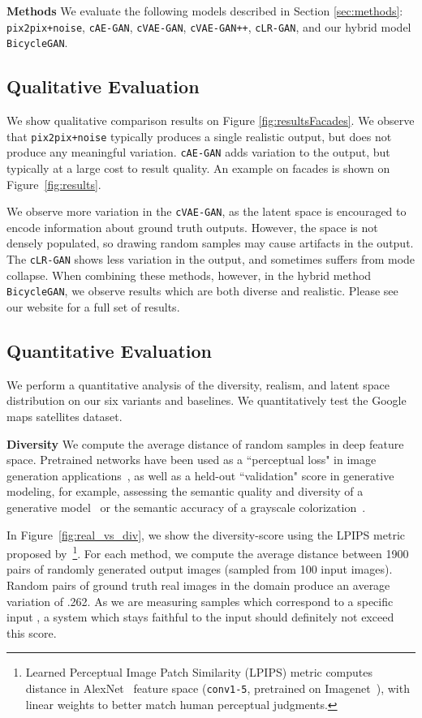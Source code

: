 \documentclass{article}
\newcommand{\ppn}{\texttt{pix2pix+noise}\xspace}
\newcommand{\cinfogan}{\texttt{cLR-GAN}\xspace}
\newcommand{\cae}{\texttt{cAE-GAN}\xspace}
\newcommand{\cvaegan}{\texttt{cVAE-GAN}\xspace}
\newcommand{\cvaeganp}{\texttt{cVAE-GAN++}\xspace}
\newcommand{\bicycle}{\texttt{BicycleGAN}\xspace} \newcommand{\G}{G\xspace}
\begin{document}
{\bf Methods} We evaluate the following models described in Section \ref{sec:methods}: \ppn, \cae, \cvaegan, \cvaeganp, \cinfogan, and our hybrid model \bicycle.

\subsection{Qualitative Evaluation}
\vspace{-1mm}
We show qualitative comparison results on Figure \ref{fig:resultsFacades}. We observe that \ppn typically produces a single realistic output, but does not produce any meaningful variation.
\cae adds variation to the output, but typically at a large cost to result quality. An example on facades is shown on Figure~\ref{fig:results}.

We observe more variation in the \cvaegan, as the latent space is encouraged to encode information about ground truth outputs. However, the space is not densely populated, so drawing random samples may cause artifacts in the output. The \cinfogan shows less variation in the output, and sometimes suffers from mode collapse. When combining these methods, however, in the hybrid method \bicycle, we observe results which are both diverse and realistic. Please see our website for a full set of results.

\vspace{-1mm}
\subsection{Quantitative Evaluation}
\vspace{-1mm}
We perform a quantitative analysis of the diversity, realism, and latent space distribution on our six variants and baselines. We quantitatively test the Google maps  satellites dataset.

{\bf Diversity} We compute the average distance of random samples in deep feature space. Pretrained networks have been used as a ``perceptual loss" in image generation applications~\citep{gatys2016image,johnson2016perceptual,dosovitskiy2016generating}, as well as a held-out ``validation" score in generative modeling, for example, assessing the semantic quality and diversity of a generative model~\citep{salimans2016improved} or the semantic accuracy of a grayscale colorization~\citep{zhang2016colorful}.

In Figure~\ref{fig:real_vs_div}, we show the diversity-score using the LPIPS metric proposed by~\cite{zhang2018unreasonable}\footnote{Learned Perceptual Image Patch Similarity (LPIPS) metric computes distance in AlexNet~\cite{krizhevsky2014one} feature space (\texttt{conv1-5}, pretrained on Imagenet~\citep{russakovsky2015imagenet}), with linear weights to better match human perceptual judgments.}. For each method, we compute the average distance between 1900 pairs of randomly generated output  images (sampled from 100 input  images). Random pairs of ground truth real images in the  domain produce an average variation of .262. As we are measuring samples  which correspond to a specific input , a system which stays faithful to the input should definitely not exceed this score.
\end{document}
